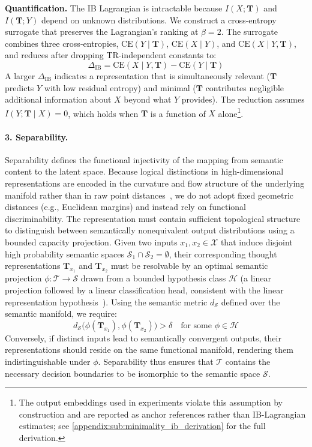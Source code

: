\textbf{Quantification.} The IB Lagrangian is intractable because $I(X; \mathbf{T})$ and $I(\mathbf{T}; Y)$ depend on unknown distributions. We construct a cross-entropy surrogate that preserves the Lagrangian's ranking at $\beta = 2$. The surrogate combines three cross-entropies, $\text{CE}(Y \mid \mathbf{T})$, $\text{CE}(X \mid Y)$, and $\text{CE}(X \mid Y, \mathbf{T})$, and reduces after dropping TR-independent constants to:
\begin{equation}\label{eq:delta-ib}
    \Delta_{\text{IB}} = \text{CE}(X \mid Y, \mathbf{T}) - \text{CE}(Y \mid \mathbf{T})
\end{equation}
A larger $\Delta_{\text{IB}}$ indicates a representation that is simultaneously relevant ($\mathbf{T}$ predicts $Y$ with low residual entropy) and minimal ($\mathbf{T}$ contributes negligible additional information about $X$ beyond what $Y$ provides). The reduction assumes $I(Y; \mathbf{T} \mid X) = 0$, which holds when $\mathbf{T}$ is a function of $X$ alone\footnote{The output embeddings used in experiments violate this assumption by construction and are reported as anchor references rather than IB-Lagrangian estimates; see \cref{appendix:sub:minimality_ib_derivation} for the full derivation.}.

\paragraph{3. Separability.}
Separability defines the functional injectivity of the mapping from semantic content to the latent space. Because logical distinctions in high-dimensional representations are encoded in the curvature and flow structure of the underlying manifold rather than in raw point distances~\citep{zhou2026geometryreasoning}, we do not adopt fixed geometric distances (e.g., Euclidean margins) and instead rely on functional discriminability. The representation must contain sufficient topological structure to distinguish between semantically nonequivalent output distributions using a bounded capacity projection. Given two inputs $x_1, x_2 \in \mathcal{X}$ that induce disjoint high probability semantic spaces $\mathcal{S}_1 \cap \mathcal{S}_2 = \emptyset$, their corresponding thought representations $\mathbf{T}_{x_1}$ and $\mathbf{T}_{x_2}$ must be resolvable by an optimal semantic projection $\phi: \mathcal{T} \to \mathcal{S}$ drawn from a bounded hypothesis class $\mathcal{H}$ (a linear projection followed by a linear classification head, consistent with the linear representation hypothesis~\citep{park2024linear}). Using the semantic metric $d_\mathcal{S}$ defined over the semantic manifold, we require:
\begin{equation}\label{eq:separability-axiom}
    d_\mathcal{S}\big(\phi(\mathbf{T}_{x_1}), \phi(\mathbf{T}_{x_2})\big) > \delta \quad \text{for some } \phi \in \mathcal{H}
\end{equation}
Conversely, if distinct inputs lead to semantically convergent outputs, their representations should reside on the same functional manifold, rendering them indistinguishable under $\phi$. Separability thus ensures that $\mathcal{T}$ contains the necessary decision boundaries to be isomorphic to the semantic space $\mathcal{S}$.

